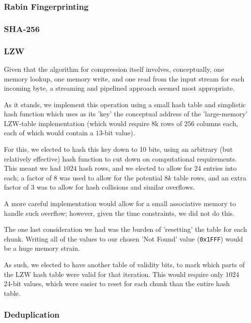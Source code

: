 \documentclass{article}
\begin{document}
\subsubsection{Rabin Fingerprinting}

\subsubsection{SHA-256}

\subsubsection{LZW}

Given that the algorithm for compression itself involves, conceptually, one memory lookup, one memory write, and one read from the input stream for each incoming byte,
a streaming and pipelined approach seemed most appropriate.
\par
As it stands, we implement this operation using a small hash table and simplistic hash function which uses as its 'key'
the conceptual address of the 'large-memory' LZW-table implementation (which would require 8k rows of $256$ columns each, each of which would contain a $13$-bit value).
\par
For this, we elected to hash this key down to 10 bits, using an arbitrary (but relatively effective) hash function to cut down on computational requirements.
This meant we had $1024$ hash rows, and we elected to allow for $24$ entries into each; a factor of $8$ was used to allow for the potential $8k$ table rows, and an extra factor of $3$ was to allow for hash collisions and similar overflows.
\par
A more careful implementation would allow for a small associative memory to handle such overflow; however, given the time constraints, we did not do this.
\newline\par
The one last consideration we had was the burden of 'resetting' the table for each chunk.
Writing all of the values to our chosen 'Not Found' value (\texttt{0x1FFF}) would be a huge memory strain.
\par
As such, we elected to have another table of validity bits, to mark which parts of the LZW hash table were valid for that iteration.
This would require only $1024$ 24-bit values, which were easier to reset for each chunk than the entire hash table.

\subsubsection{Deduplication}
\end{document}

